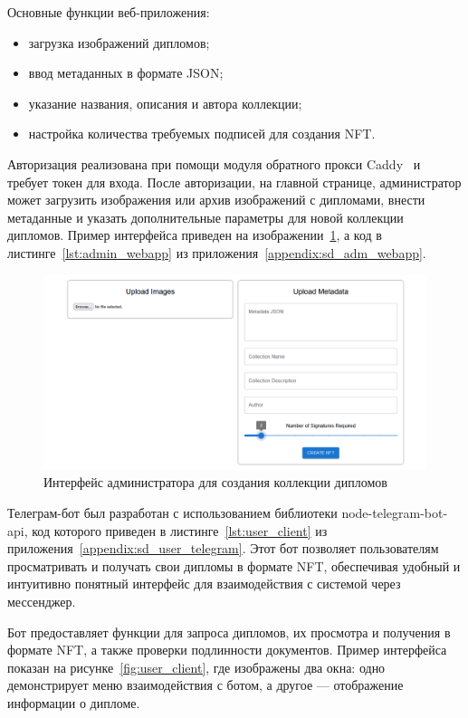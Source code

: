 Основные функции веб-приложения:
\begin{itemize}
    \item загрузка изображений дипломов;
    \item ввод метаданных в формате JSON;
    \item указание названия, описания и автора коллекции;
    \item настройка количества требуемых подписей для создания NFT.
\end{itemize}

Авторизация реализована при помощи модуля обратного прокси Caddy~\cite{bib:caddy} и требует токен для входа. После авторизации, на главной странице, администратор может загрузить изображения или архив изображений с дипломами, внести метаданные и указать дополнительные параметры для новой коллекции дипломов. Пример интерфейса приведен на изображении~\ref{fig:admin_webapp}, а код в листинге~\ref{lst:admin_webapp} из приложения~\ref{appendix:sd_adm_webapp}.

\begin{figure}[H]
	\centering
	\includegraphics[width=1\textwidth]{images/3.admin_webapp.png}
	\parskip=6pt
	\caption{Интерфейс администратора для создания коллекции дипломов}
	\label{fig:admin_webapp}
\end{figure}

Телеграм-бот был разработан с использованием библиотеки node-telegram-bot-api, код которого приведен в листинге~\ref{lst:user_client} из приложения~\ref{appendix:sd_user_telegram}. Этот бот позволяет пользователям просматривать и получать свои дипломы в формате NFT, обеспечивая удобный и интуитивно понятный интерфейс для взаимодействия с системой через мессенджер.

Бот предоставляет функции для запроса дипломов, их просмотра и получения в формате NFT, а также проверки подлинности документов. Пример интерфейса показан на рисунке~\ref{fig:user_client}, где изображены два окна: одно демонстрирует меню взаимодействия с ботом, а другое — отображение информации о дипломе.

